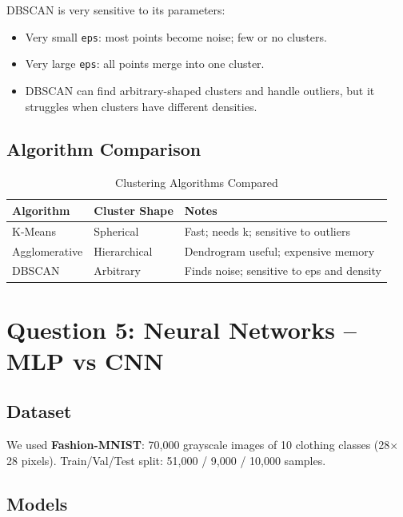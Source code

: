 \documentclass[11pt,a4paper]{article}
\begin{document}
DBSCAN is very sensitive to its parameters:
\begin{itemize}
    \item Very small \texttt{eps}: most points become noise; few or no clusters.
    \item Very large \texttt{eps}: all points merge into one cluster.
    \item DBSCAN can find arbitrary-shaped clusters and handle outliers, but it struggles when clusters have different densities.
\end{itemize}

\subsection{Algorithm Comparison}

\begin{table}[H]
\centering
\caption{Clustering Algorithms Compared}
\begin{tabular}{lll}
\toprule
\textbf{Algorithm} & \textbf{Cluster Shape} & \textbf{Notes} \\
\midrule
K-Means        & Spherical & Fast; needs k; sensitive to outliers \\
Agglomerative  & Hierarchical & Dendrogram useful; expensive memory \\
DBSCAN         & Arbitrary & Finds noise; sensitive to eps and density \\
\bottomrule
\end{tabular}
\end{table}

\newpage

\section{Question 5: Neural Networks -- MLP vs CNN}

\subsection{Dataset}

We used \textbf{Fashion-MNIST}: 70{,}000 grayscale images of 10 clothing classes (28$\times$28 pixels).
Train/Val/Test split: 51{,}000 / 9{,}000 / 10{,}000 samples.

\subsection{Models}
\end{document}
